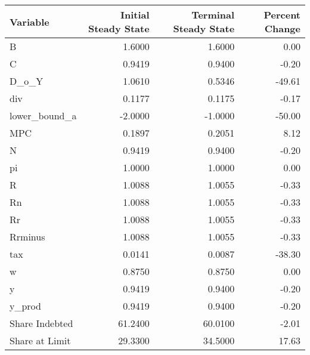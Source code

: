 \begin{table}
\centering
\label{tab:stst_labour}
\begin{tabular}{lrrr}
\toprule
      Variable &  Initial Steady State &  Terminal Steady State &  Percent Change \\
\midrule
             B &                1.6000 &                 1.6000 &            0.00 \\
             C &                0.9419 &                 0.9400 &           -0.20 \\
         D\_o\_Y &                1.0610 &                 0.5346 &          -49.61 \\
           div &                0.1177 &                 0.1175 &           -0.17 \\
 lower\_bound\_a &               -2.0000 &                -1.0000 &          -50.00 \\
           MPC &                0.1897 &                 0.2051 &            8.12 \\
             N &                0.9419 &                 0.9400 &           -0.20 \\
            pi &                1.0000 &                 1.0000 &            0.00 \\
             R &                1.0088 &                 1.0055 &           -0.33 \\
            Rn &                1.0088 &                 1.0055 &           -0.33 \\
            Rr &                1.0088 &                 1.0055 &           -0.33 \\
       Rrminus &                1.0088 &                 1.0055 &           -0.33 \\
           tax &                0.0141 &                 0.0087 &          -38.30 \\
             w &                0.8750 &                 0.8750 &            0.00 \\
             y &                0.9419 &                 0.9400 &           -0.20 \\
        y\_prod &                0.9419 &                 0.9400 &           -0.20 \\
Share Indebted &               61.2400 &                60.0100 &           -2.01 \\
Share at Limit &               29.3300 &                34.5000 &           17.63 \\
\bottomrule
\end{tabular}
\end{table}
